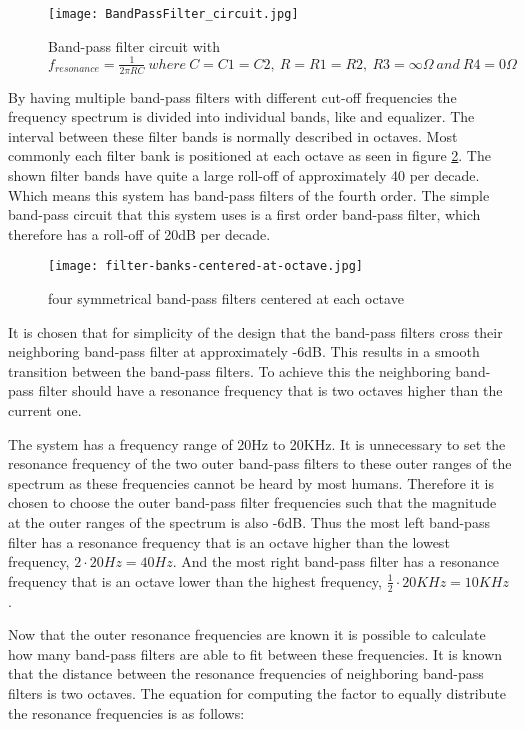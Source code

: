 \begin{figure}[ht]
    \texttt{[image: BandPassFilter\_circuit.jpg]}
    \caption{Band-pass filter circuit with $f_{resonance}=\frac{1}{2\pi RC}\ where\ C=C1=C2,\ R=R1=R2,\ R3=\infty\Omega\ and\ R4=0\Omega$}
    \label{fig:bpf-circuit}
\end{figure}

By having multiple band-pass filters with different cut-off frequencies the frequency spectrum is divided into individual bands, like and equalizer. The interval between these filter bands is normally described in octaves. Most commonly each filter bank is positioned at each octave as seen in figure \ref{fig:filter-banks-octave}. The shown filter bands have quite a large roll-off of approximately 40 per decade. Which means this system has band-pass filters of the fourth order. The simple band-pass circuit that this system uses is a first order band-pass filter, which therefore has a roll-off of 20dB per decade. 

\begin{figure}[ht]
    \texttt{[image: filter-banks-centered-at-octave.jpg]}
    \caption{four symmetrical band-pass filters centered at each octave}
    \label{fig:filter-banks-octave}
\end{figure}

It is chosen that for simplicity of the design that the band-pass filters cross their neighboring band-pass filter at approximately -6dB. This results in a smooth transition between the band-pass filters. To achieve this the neighboring band-pass filter should have a resonance frequency that is two octaves higher than the current one.

The system has a frequency range of 20Hz to 20KHz. It is unnecessary to set the resonance frequency of the two outer band-pass filters to these outer ranges of the spectrum as these frequencies cannot be heard by most humans. Therefore it is chosen to choose the outer band-pass filter frequencies such that the magnitude at the outer ranges of the spectrum is also -6dB. Thus the most left band-pass filter has a resonance frequency that is an octave higher than the lowest frequency, $2\cdot20Hz=40Hz$. And the most right band-pass filter has a resonance frequency that is an octave lower than the highest frequency, $\frac{1}{2}\cdot20KHz=10KHz$.

Now that the outer resonance frequencies are known it is possible to calculate how many band-pass filters are able to fit between these frequencies. It is known that the distance between the resonance frequencies of neighboring band-pass filters is two octaves. The equation for computing the factor to equally distribute the resonance frequencies is as follows: 

